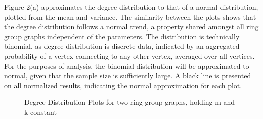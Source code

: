 \documentclass[12pt,a4paper]{article}
\begin{document}
Figure 2(a) approximates the degree distribution to that of a normal distribution, plotted from the mean and variance. The similarity between the plots shows that the degree distribution follows a normal trend, a property shared amongst all ring group graphs independent of the parameters. The distribution is technically binomial, as degree distribution is discrete data, indicated by an aggregated probability of a vertex connecting to any other vertex, averaged over all vertices. For the purposes of analysis, the binomial distribution will be approximated to normal, given that the sample size is sufficiently large. A black line is presented on all normalized results, indicating the normal approximation for each plot.

\begin{figure}
	\centering
	\qquad
	\caption{Degree Distribution Plots for two ring group graphs, holding m and k constant}
	\label{both}
\end{figure}
\end{document}
